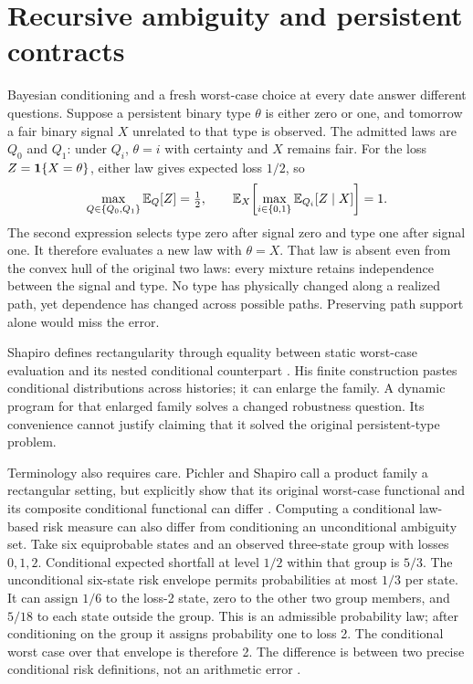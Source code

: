 

\section{Recursive ambiguity and persistent contracts}
Bayesian conditioning and a fresh worst-case choice at every date answer
different questions. Suppose a persistent binary type $\theta$ is either zero
or one, and tomorrow a fair binary signal $X$ unrelated to that type is observed.
The admitted laws are $Q_0$ and $Q_1$: under $Q_i$, $\theta=i$ with certainty
and $X$ remains fair. For the loss $Z=\mathbf 1\{X=\theta\}$, either law gives
expected loss $1/2$, so
\begin{equation}
\max_{Q\in\{Q_0,Q_1\}}\mathbb{E}_Q[Z]=\tfrac12,\qquad
\mathbb{E}_X\!\left[\max_{i\in\{0,1\}}\mathbb{E}_{Q_i}[Z\mid X]\right]=1.
\end{equation}
The second expression selects type zero after signal zero and type one after
signal one. It therefore evaluates a new law with $\theta=X$. That law is
absent even from the convex hull of the original two laws: every mixture
retains independence between the signal and type. No type has physically
changed along a realized path, yet dependence has changed across possible
paths. Preserving path support alone would miss the error.

Shapiro defines rectangularity through equality between static worst-case
evaluation and its nested conditional counterpart
\cite[Definition~2.1, Theorem~2.1 and proof, Section~5]{litcloseshapiro}.
His finite construction pastes conditional distributions across histories; it
can enlarge the family. A dynamic program for that enlarged family solves
a changed robustness question. Its convenience cannot justify claiming that
it solved the original persistent-type problem.

Terminology also requires care. Pichler and Shapiro call a product family a
rectangular setting, but explicitly show that its original worst-case
functional and its composite conditional functional can differ
\cite[Section~4.2, Example~4.7]{litclosepichlershapiro}. Computing a conditional
law-based risk measure can also differ from conditioning an unconditional
ambiguity set. Take six equiprobable states and an observed three-state
group with losses $0,1,2$. Conditional expected shortfall at level $1/2$
within that group is $5/3$. The unconditional six-state risk envelope permits
probabilities at most $1/3$ per state. It can assign $1/6$ to the loss-2 state,
zero to the other two group members, and $5/18$ to each state outside the
group. This is an admissible probability law; after conditioning on the group
it assigns probability one to loss 2. The conditional worst case over that
envelope is therefore 2. The difference is between two precise conditional
risk definitions, not an arithmetic error
\cite[Example~3.2 and equations~(3.1)--(3.5)]{litclosepichlershapiro}.


